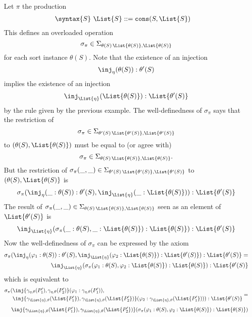 \documentclass{article}
\theoremstyle{definition}
\theoremstyle{definition}
\theoremstyle{definition}
\theoremstyle{definition}
\theoremstyle{theorem}
\theoremstyle{theorem}
\theoremstyle{theorem}
\theoremstyle{theorem}
\theoremstyle{theorem}
\begin{document}
\begin{enumerate}[label=(\arabic*)]
{Let $\pi$ the production
\begin{align*}
&\syntax\{S\}\ \List{S}::=\texttt{cons}(S,\List{S})
\end{align*}
This defines an overloaded operation 
\[\sigma_\pi\in\Sigma_{\theta(S)\,\List{\theta(S)},\List{\theta(S)}}\]
for each sort instance $\theta(S)$. 
Note that 
the existence of an injection 
\[\inj_{\eta}(\theta(S)):\theta'(S)\] 
implies the existence of an injection
\[\inj_{\List{\eta}}(\List{\theta(S)}):\List{\theta'(S)}\] 
by the rule given by the previous example.  The well-definedness of $\sigma_\pi$ says that the restriction of 
\[\sigma_\pi\in\Sigma_{\theta'(S)\,\List{\theta'(S)},\List{\theta'(S)}}\] 
to $(\theta(S),\List{\theta(S)})$ must be equal to (or agree with)  
\[\sigma_\pi\in\Sigma_{\theta(S)\,\List{\theta(S)},\List{\theta(S)}}.\]
But the restriction of $\sigma_\pi(\_,\_)\in\Sigma_{\theta'(S)\,\List{\theta'(S)},\List{\theta'(S)}}$ to $(\theta(S),\List{\theta(S)}$ is
\[
\sigma_\pi(\inj_{\eta}(\_:\theta(S)):\theta'(S), \inj_{\List{\eta}}(\_:\List{\theta(S)})):\List{\theta'(S)}
\]
The result of $\sigma_\pi(\_,\_)\in\Sigma_{\theta(S)\,\List{\theta(S)},\List{\theta(S)}}$ seen as an element of $\List{\theta'(S)}$ is 
\[
\inj_{\List{\eta}}(\sigma_\pi(\_:\theta(S),\_:\List{\theta(S)}):\List{\theta(S)}):\List{\theta'(S)}
\]
Now the well-definedness of $\sigma_\pi$ can be expressed by the axiom
\[
\begin{split}
\sigma_\pi(\inj_{\eta}(\varphi_1:\theta(S)):\theta'(S), \inj_{\List{\eta}}(\varphi_2:\List{\theta(S)}):\List{\theta'(S)}):\List{\theta'(S)}=\\
\inj_{\List{\eta}}(\sigma_\pi(\varphi_1:\theta(S),\varphi_2:\List{\theta(S)}):\List{\theta(S)}):\List{\theta'(S)}
\end{split}
\]
which is equivalent to 
\[
\begin{split}
\begin{aligned}
\sigma_\pi(&\inj\{\gamma_{\eta,\theta}(P'_1),\gamma_{\eta,\theta}(P'_2)\}(\varphi_1:\gamma_{\eta,\theta}(P'_1)), \\
&\inj\{\gamma_{\List{\eta},\theta}(\List{P'_1}),\gamma_{\List{\eta},\theta}(\List{P'_2})\}(\varphi_2:\gamma_{\List{\eta},\theta}(\List{P'_1}))):\List{\theta'(S)}
\end{aligned}=\\[1ex]
\inj\{\gamma_{\List{\eta},\theta}(\List{P'_1}),\gamma_{\List{\eta},\theta}(\List{P'_2})\}(\sigma_\pi(\varphi_1:\theta(S),\varphi_2:\List{\theta(S)}):\List{\theta(S)})

\end{split}\]}
\end{enumerate}
\end{document}
